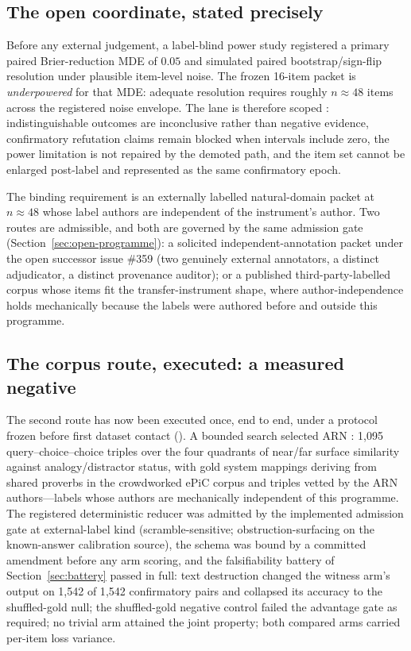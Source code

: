 \subsection{The open coordinate, stated precisely}
\label{sec:open-coordinate}

Before any external judgement, a label-blind power study registered a primary paired Brier-reduction MDE of $0.05$ and simulated paired bootstrap/sign-flip resolution under plausible item-level noise. The frozen 16-item packet is \emph{underpowered} for that MDE: adequate resolution requires roughly $n\approx48$ items across the registered noise envelope. The lane is therefore scoped : indistinguishable outcomes are inconclusive rather than negative evidence, confirmatory refutation claims remain blocked when intervals include zero, the power limitation is not repaired by the demoted path, and the item set cannot be enlarged post-label and represented as the same confirmatory epoch.

The binding requirement is an externally labelled natural-domain packet at $n\approx48$ whose label authors are independent of the instrument's author. Two routes are admissible, and both are governed by the same admission gate (Section~\ref{sec:open-programme}): a solicited independent-annotation packet under the open successor issue \#359 (two genuinely external annotators, a distinct adjudicator, a distinct provenance auditor); or a published third-party-labelled corpus whose items fit the transfer-instrument shape, where author-independence holds mechanically because the labels were authored before and outside this programme.

\subsection{The corpus route, executed: a measured negative}
\label{sec:arn-negative}

The second route has now been executed once, end to end, under a protocol frozen before first dataset contact (). A bounded search selected ARN \cite{sourati2024arn}: 1{,}095 query--choice--choice triples over the four quadrants of near/far surface similarity against analogy/distractor status, with gold system mappings deriving from shared proverbs in the crowdworked ePiC corpus and triples vetted by the ARN authors---labels whose authors are mechanically independent of this programme. The registered deterministic reducer was admitted by the implemented admission gate at external-label kind (scramble-sensitive; obstruction-surfacing on the known-answer calibration source), the schema was bound by a committed amendment before any arm scoring, and the falsifiability battery of Section~\ref{sec:battery} passed in full: text destruction changed the witness arm's output on 1{,}542 of 1{,}542 confirmatory pairs and collapsed its accuracy to the shuffled-gold null; the shuffled-gold negative control failed the advantage gate as required; no trivial arm attained the joint property; both compared arms carried per-item loss variance.

